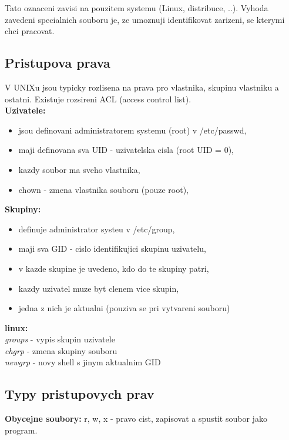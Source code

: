 \documentclass[a4paper, 11pt]{article}
\begin{document}
Tato oznaceni zavisi na pouzitem systemu (Linux, distribuce, ..). Vyhoda zavedeni specialnich souboru je, ze umoznuji identifikovat zarizeni, se kterymi chci pracovat. \\

\newpage

\subsection{Pristupova prava}
V UNIXu jsou typicky rozlisena na prava pro vlastnika, skupinu vlastniku a ostatni.
Existuje rozsireni ACL (access control list). \\

\textbf{Uzivatele:}
\begin{itemize}
    \item jsou definovani administratorem systemu (root) v /etc/passwd,
    \item maji definovana sva UID - uzivatelska cisla (root UID = 0),
    \item kazdy soubor ma sveho vlastnika,
    \item chown - zmena vlastnika souboru (pouze root), \\
\end{itemize}

\textbf{Skupiny:}
\begin{itemize}
    \item definuje administrator systeu v /etc/group,
    \item maji sva GID - cislo identifikujici skupinu uzivatelu,
    \item v kazde skupine je uvedeno, kdo do te skupiny patri,
    \item kazdy uzivatel muze byt clenem vice skupin,
    \item jedna z nich je aktualni (pouziva se pri vytvareni souboru) \\
\end{itemize}

\textbf{linux:} \\[0.5em]
\textit{groups} - vypis skupin uzivatele \\[0.2em]
\textit{chgrp} - zmena skupiny souboru \\[0.2em]
\textit{newgrp} - novy shell s jinym aktualnim GID \\

\newpage

\subsection{Typy pristupovych prav}
\textbf{Obycejne soubory:}
r, w, x - pravo cist, zapisovat a spustit soubor jako program. \\
\end{document}
